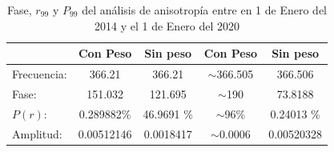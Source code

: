 \begin{table}[H]
\centering
\begin{tabular}{l|c|c|c|c}
				& Con Peso 		& Sin peso 		& Con Peso 		& Sin peso 		\\ \hline
Frecuencia:		& 366.21 		& 366.21 		& $\sim$366.505 & 366.506 		\\
Fase:			& 151.032 		& 121.695		& $\sim$190 	& 73.8188		\\
$P(r)$:		   & 0.289882\%	  & 46.9691 \% 	& $\sim$96\%	& 0.24013 \% 	\\
Amplitud:		& 0.00512146	& 0.0018417		& $\sim$0.0006	& 0.00520328	\\
\end{tabular}
\caption{Fase, $r_{99}$ y $P_{99}$ del análisis de anisotropía entre en 1 de Enero del 2014 y el 1 de Enero del 2020}
\label{tabla:pico}
\end{table}


